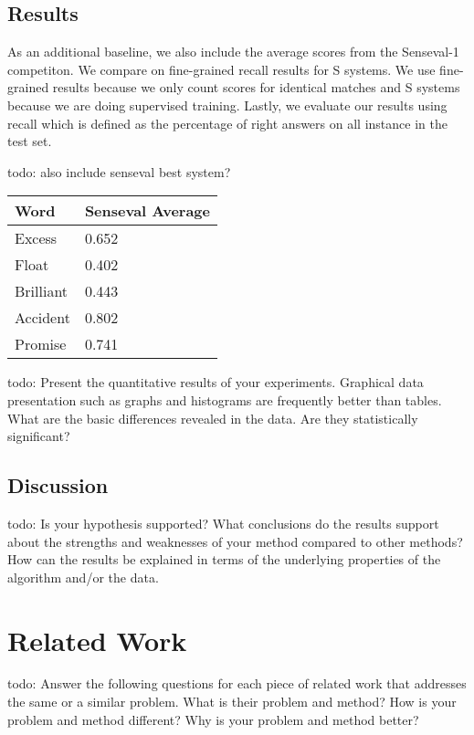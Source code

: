 \documentclass[12pt]{article}
\begin{document}
\subsection{Results}

As an additional baseline, we also include the average scores from the Senseval-1 competiton\cite{se}. We compare on fine-grained recall results for S systems. We use fine-grained results because we only count scores for identical matches and S systems because we are doing supervised training. Lastly, we evaluate our results using recall which is defined as the percentage of right answers on all instance in the test set\cite{recall}.

todo: also include senseval best system?

\begin{table}[h]
\begin{tabular}{l|l}
\hline
Word      & Senseval Average  \\ \hline
Excess    & 0.652                     \\
Float     & 0.402                      \\
Brilliant & 0.443                      \\ 
Accident  & 0.802                   \\
Promise   & 0.741                      
\end{tabular}
\end{table}

todo: Present the quantitative results of your experiments. Graphical data presentation such as graphs and histograms are frequently better than tables. What are the basic differences revealed in the data. Are they statistically significant?

\subsection{Discussion}

todo: Is your hypothesis supported? What conclusions do the results support about the strengths and weaknesses of your method compared to other methods? How can the results be explained in terms of the underlying properties of the algorithm and/or the data. 

\section{Related Work}

todo: Answer the following questions for each piece of related work that addresses the same or a similar problem. What is their problem and method? How is your problem and method different? Why is your problem and method better? 
\end{document}
